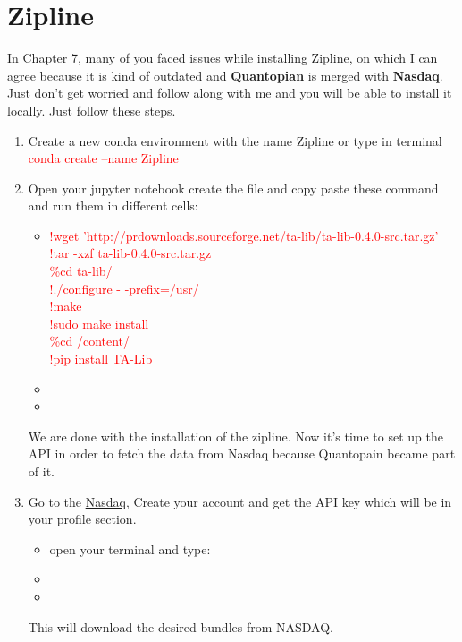 \documentclass[12pt,a4paper]{article}
\begin{document}
\section*{Zipline}
In Chapter 7, many of you faced issues while installing Zipline, on which I can agree because it is kind of outdated and \textbf{Quantopian} is merged with \textbf{Nasdaq}. Just don't get worried and follow along with me and you will be able to install it locally. Just follow these steps.
\begin{enumerate}
    \item Create a new conda environment with the name Zipline or type in terminal\\
    \textcolor{red}{conda create --name Zipline}
    \item Open your jupyter notebook create the file and copy paste these command and run them in different cells:
    \begin{itemize} 
    \item   \textcolor{red}{!wget 'http://prdownloads.sourceforge.net/ta-lib/ta-lib-0.4.0-src.tar.gz'\\
!tar -xzf ta-lib-0.4.0-src.tar.gz\\
\%cd ta-lib/\\
!./configure - -prefix=/usr/\\
!make\\
!sudo make install\\
\%cd /content/\\
!pip install TA-Lib}
\item\color{red}{!pip install zipline-reloaded}
\item\color{red}{!pip3 install nasdaq-data-link}
\end{itemize}
We are done with the installation of the zipline. Now it's time to set up the API in order to fetch the data from Nasdaq because Quantopain became part of it.
\item Go to the \href{https://data.nasdaq.com/}{Nasdaq}, Create your account and get the API key which will be in your profile section.
\begin{itemize}
    \item open your terminal and type:
    \item  \color{red}{export QUANDL\_API\_KEY=YOUR NASDAQ API KEY}
   \item  \color{red}{ zipline ingest –b quandl}
    
\end{itemize}
This will download the desired bundles from NASDAQ.
\end{enumerate}
\end{document}
